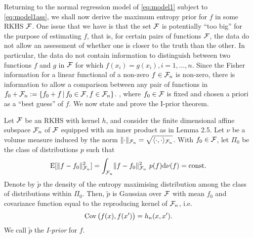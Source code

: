 Returning to the normal regression model of \eqref{eq:model1} subject to \eqref{eq:model1ass}, we shall now derive the maximum entropy prior for $f$ in some RKHS ${\mathcal F}$.
One issue that we have is that the set ${\mathcal F}$ is potentially ``too big'' for the purpose of estimating $f$, that is, for certain pairs of functions ${\mathcal F}$, the data do not allow an assessment of whether one is closer to the truth than the other.
In particular, the data do not contain information to distinguish between two functions $f$ and $g$ in ${\mathcal F}$ for which $f(x_i) = g(x_i), i=1,\dots,n$.
Since the Fisher information for a linear functional of a non-zero $f \in {\mathcal F}_n$ is non-zero, there is information to allow a comparison between any pair of functions in $f_0 + {\mathcal F}_n := \{f_0 + f \,|\, f_0 \in {\mathcal F}, f \in {\mathcal F}_n \}$.
, where $f_0 \in {\mathcal F}$ is fixed and chosen a priori as a ``best guess'' of $f$.
We now state and prove the I-prior theorem.

\begin{theorem}
  Let ${\mathcal F}$ be an RKHS with kernel $h$, and consider the finite dimensional affine subspace ${\mathcal F}_n$ of ${\mathcal F}$ equipped with an inner product as in Lemma 2.5.
  Let $\nu$ be a volume measure induced by the norm $\lVert\cdot\rVert_{{\mathcal F}_n} = \sqrt{\langle\cdot,\cdot\rangle_{{\mathcal F}_n}}$.
  With $f_0 \in {\mathcal F}$, let $\Pi_0$ be the class of distributions $p$ such that 
  \[
    \operatorname{E}[\lVert f-f_0\rVert^2_{{\mathcal F}_n}] = \int_{{\mathcal F}_n} \lVert f-f_0\rVert^2_{{\mathcal F}_n} \ p(f) \text{d}\nu(f) = \text{const.}
  \]
  Denote by $\tilde p$ the density of the entropy maximising distribution among the class of distributions within $\Pi_0$.
  Then, $\tilde p$ is Gaussian over ${\mathcal F}$ with mean $f_0$ and covariance function equal to the reproducing kernel of ${\mathcal F}_n$, i.e.
  \[
    \operatorname{Cov}\big(f(x),f(x')\big) = h_n(x,x').
  \]
  We call $\tilde p$ the \emph{I-prior} for $f$.
\end{theorem}

